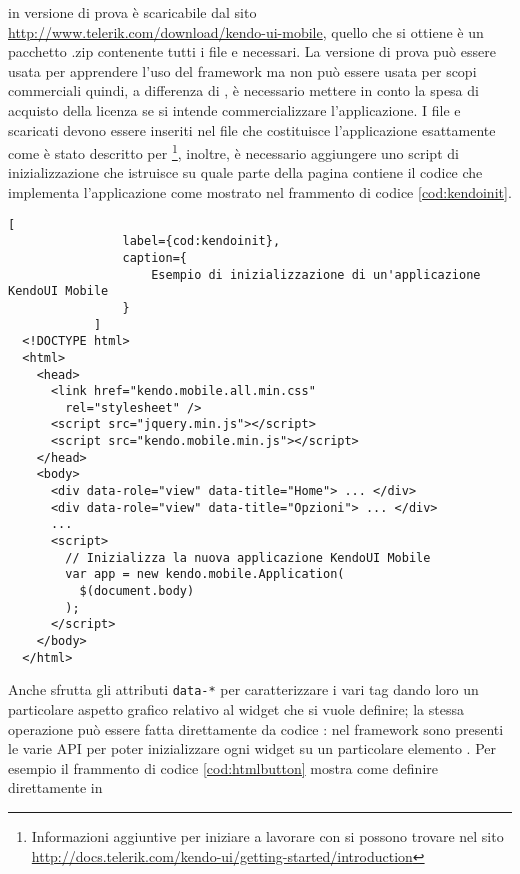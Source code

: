            \kendomob{} in versione di prova è scaricabile dal sito
            \url{http://www.telerik.com/download/kendo-ui-mobile}, quello che si
            ottiene è un pacchetto .zip contenente tutti i file \js{} e \css{}
            necessari. La versione di prova può essere usata per apprendere
            l'uso del frame\-work ma non può essere usata per scopi commerciali
            quindi, a differenza di \jqm{}, è necessario mettere in conto
            la spesa di acquisto della licenza se si intende commercializzare
            l'applicazione. I file \js{} e \css{} scaricati devono essere
            inseriti nel file \html{} che costituisce l'applicazione esattamente
            come è stato descritto per \jqm{}\footnote{Informazioni
            aggiuntive per iniziare a lavorare con \kendomob{} si possono
            trovare nel sito \url{http://docs.telerik.com/kendo-ui/getting-started/introduction}},
            inoltre, è necessario aggiungere uno script di inizializzazione che
            istruisce \kendomob{} su quale parte della pagina \html{} contiene il
            codice che implementa l'applicazione come mostrato nel frammento di
            codice \ref{cod:kendoinit}.
            \begin{lstlisting}[
                label={cod:kendoinit},
                caption={
                    Esempio di inizializzazione di un'applicazione KendoUI Mobile
                }
            ]
  <!DOCTYPE html>
  <html>
    <head>
      <link href="kendo.mobile.all.min.css"
        rel="stylesheet" />
      <script src="jquery.min.js"></script>
      <script src="kendo.mobile.min.js"></script>
    </head>
    <body>
      <div data-role="view" data-title="Home"> ... </div>
      <div data-role="view" data-title="Opzioni"> ... </div>
      ...
      <script>
        // Inizializza la nuova applicazione KendoUI Mobile
        var app = new kendo.mobile.Application(
          $(document.body)
        );
      </script>
    </body>
  </html>
            \end{lstlisting}
            Anche \kendomob{} sfrutta gli attributi \verb|data-*| per
            caratterizzare i vari tag \html{} dando loro un particolare aspetto
            grafico relativo al widget che si vuole definire; la stessa
            operazione può essere fatta direttamente da codice \js{}: nel
            frame\-work sono presenti le varie API per poter inizializzare ogni
            widget su un particolare elemento \html{}. Per esempio il frammento di
            codice \ref{cod:htmlbutton} mostra come definire direttamente in
